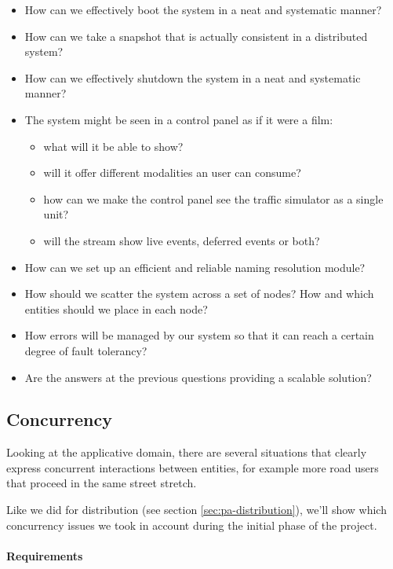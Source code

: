 \begin{itemize}
\item How can we effectively boot the system in a neat and systematic manner?
\item How can we take a snapshot that is actually consistent in a distributed
  system?
\item How can we effectively shutdown the system in a neat and systematic
  manner?
\item The system might be seen in a control panel as if it were a film:
  \begin{itemize}
  \item what will it be able to show?
  \item will it offer different modalities an user can consume?
  \item how can we make the control panel see the traffic simulator as a
    single unit?
  \item will the stream show live events, deferred events or both?
  \end{itemize}
\item How can we set up an efficient and reliable naming resolution module?
\item How should we scatter the system across a set of nodes? How and which
  entities should we place in each node?
\item How errors will be managed by our system so that it can reach a certain
  degree of fault tolerancy?
\item Are the answers at the previous questions providing a scalable solution?
\end{itemize}

\subsection{Concurrency}
Looking at the applicative domain, there are several situations that clearly
express concurrent interactions between entities, for example more road users
that proceed in the same street stretch.

Like we did for distribution (see section \ref{sec:pa-distribution}), we'll
show which concurrency issues we took in account during the initial phase of
the project.

\paragraph{Requirements} \mbox{} \\

